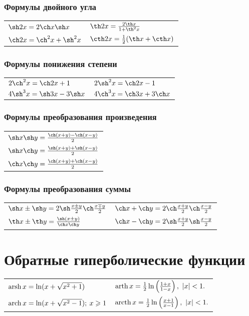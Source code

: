 \subsubsection{Формулы двойного угла}
\begin{longtable}[l]{l l}
$\sh 2x = 2\ch x\sh x$
&
$\th 2x = \frac{2\th x}{1 + \th^2 x}$
\\
$\ch 2x = \ch^2 x + \sh^2 x$
&
$\cth 2x = \frac{1}{2}(\th x + \cth x)$
\end{longtable}

\subsubsection{Формулы понижения степени}
\begin{longtable}[l]{l l}
$2\ch^2 x = \ch 2x + 1$
&
$2\sh^2 x = \ch 2x - 1$
\\
$4\sh^3 x = \sh 3x - 3 \sh x$
&
$4 \ch^3 x = \ch 3x + 3 \ch x$
\end{longtable}

\subsubsection{Формулы преобразования произведения}
\begin{longtable}[l]{ l}
$\sh x \sh y = \frac{\ch(x + y) - \ch (x - y)}{2}$
\\
$\sh x \ch y = \frac{\sh(x + y) + \sh(x - y)}{2}$
\\
$\ch x \ch y = \frac{\ch(x + y) + \ch(x - y)}{2}$
\end{longtable}

\subsubsection{Формулы преобразования суммы}
\begin{longtable}[l]{l  l}
$\sh x \pm \sh y = 2 \sh\frac{x \pm y}{2} \ch\frac{x \mp y}{2}$
&
$\ch x + \ch y = 2 \ch\frac{x + y}{2}\ch\frac{x - y}{2}$
\\
$\th x \pm \th y = \frac{\sh(x \pm y)}{\ch x \ch y}$
&
$\ch x - \ch y = 2 \sh\frac{x + y}{2}\sh\frac{x - y}{2}$
\end{longtable}

\section{Обратные гиперболические функции}

\begin{longtable}[l]{l l}
$\operatorname{arsh} x = \ln(x + \sqrt{x^2 + 1})$
&
$\arth x = \frac{1}{2}\ln \left(\frac{1 + x}{1 - x} \right),\ |x|<1.$
\\
$\operatorname{arch} x = \ln(x + \sqrt{x^2 - 1}); \: x \geqslant 1$
&
$\arcth x = \frac{1}{2}\ln \left( \frac{x+ 1}{x - 1} \right),\ |x|<1.$
\end{longtable}


